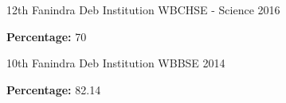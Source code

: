 \begin{cventries}
  \cventry
    {12th} %
    {Fanindra Deb Institution} %
    {WBCHSE - Science} %
    {2016} %
    {
      \begin{cvitems} %
        \item {\textbf{Percentage:} 70}
      \end{cvitems}
    }

  \cventry
    {10th} %
    {Fanindra Deb Institution} %
    {WBBSE} %
    {2014} %
    {
      \begin{cvitems} %
        \item {\textbf{Percentage:} 82.14}
      \end{cvitems}
    }
\end{cventries}
